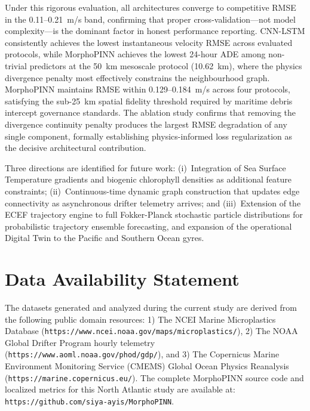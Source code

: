 \documentclass[conference]{IEEEtran}
\begin{document}
Under this rigorous evaluation, all architectures converge to competitive RMSE in the 0.11--0.21~m/s band, confirming that proper cross-validation---not model complexity---is the dominant factor in honest performance reporting. CNN-LSTM consistently achieves the lowest instantaneous velocity RMSE across evaluated protocols, while MorphoPINN achieves the lowest 24-hour ADE among non-trivial predictors at the 50~km mesoscale protocol (10.62~km), where the physics divergence penalty most effectively constrains the neighbourhood graph. MorphoPINN maintains RMSE within 0.129--0.184~m/s across four protocols, satisfying the sub-25~km spatial fidelity threshold required by maritime debris intercept governance standards. The ablation study confirms that removing the divergence continuity penalty produces the largest RMSE degradation of any single component, formally establishing physics-informed loss regularization as the decisive architectural contribution.

Three directions are identified for future work:
(i)~Integration of Sea Surface Temperature gradients and biogenic chlorophyll densities as additional feature constraints;
(ii)~Continuous-time dynamic graph construction that updates edge connectivity as asynchronous drifter telemetry arrives; and
(iii)~Extension of the ECEF trajectory engine to full Fokker-Planck stochastic particle distributions for probabilistic trajectory ensemble forecasting, and expansion of the operational Digital Twin to the Pacific and Southern Ocean gyres.

\section*{Data Availability Statement}
The datasets generated and analyzed during the current study are derived from the following public domain resources:
1) The NCEI Marine Microplastics Database (\texttt{https://www.ncei.noaa.gov/maps/microplastics/}),
2) The NOAA Global Drifter Program hourly telemetry (\texttt{https://www.aoml.noaa.gov/phod/gdp/}), and
3) The Copernicus Marine Environment Monitoring Service (CMEMS) Global Ocean Physics Reanalysis (\texttt{https://marine.copernicus.eu/}).
The complete MorphoPINN source code and localized metrics for this North Atlantic study are available at: \texttt{https://github.com/siya-ayis/MorphoPINN}.
\end{document}
